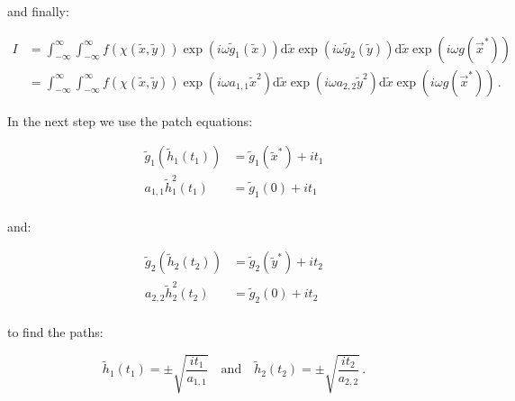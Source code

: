 \documentclass[a4paper,10pt]{article}
\begin{document}
and finally:

\begin{equation}
\begin{split}
 I &  = \int_{-\infty}^{\infty} \int_{-\infty}^{\infty}
          f\left(\chi\left(\tilde{x}, \tilde{y}\right)\right)
          \exp\left(i \omega \tilde{g}_1\left(\tilde{x}\right)\right)
        \mathrm{d}\tilde{x}
        \exp\left(i \omega \tilde{g}_2\left(\tilde{y}\right)\right)
        \mathrm{d}\tilde{x}
        \exp\left(i \omega g\left(\vec{x}^{*}\right)\right) \\
   &  = \int_{-\infty}^{\infty} \int_{-\infty}^{\infty}
          f\left(\chi\left(\tilde{x}, \tilde{y}\right)\right)
          \exp\left(i \omega a_{1,1}\tilde{x}^2\right)
        \mathrm{d}\tilde{x}
        \exp\left(i \omega a_{2,2}\tilde{y}^2\right)
        \mathrm{d}\tilde{x}
        \exp\left(i \omega g\left(\vec{x}^{*}\right)\right) \,.
\end{split}
\end{equation}

In the next step we use the patch equations:

\begin{equation}
\begin{split}
 \tilde{g}_1\left(\tilde{h}_1(t_1)\right) & = \tilde{g}_1\left(\tilde{x}^{*}\right) + i t_1 \\
 a_{1,1}\tilde{h}^2_1(t_1)                & = \tilde{g}_1\left(0\right) + i t_1 \\
\end{split}
\end{equation}

and:

\begin{equation}
\begin{split}
 \tilde{g}_2\left(\tilde{h}_2(t_2)\right) & = \tilde{g}_2\left(\tilde{y}^{*}\right) + i t_2 \\
 a_{2,2}\tilde{h}^2_2(t_2)                & = \tilde{g}_2\left(0\right) + i t_2 \\
\end{split}
\end{equation}

to find the paths:

\begin{equation}
 \tilde{h}_1\left(t_1\right) = \pm \sqrt{\frac{i t_1}{a_{1,1}}}
 \quad \mathrm{and} \quad
 \tilde{h}_2\left(t_2\right) = \pm \sqrt{\frac{i t_2}{a_{2,2}}} \,.
\end{equation}
\end{document}
